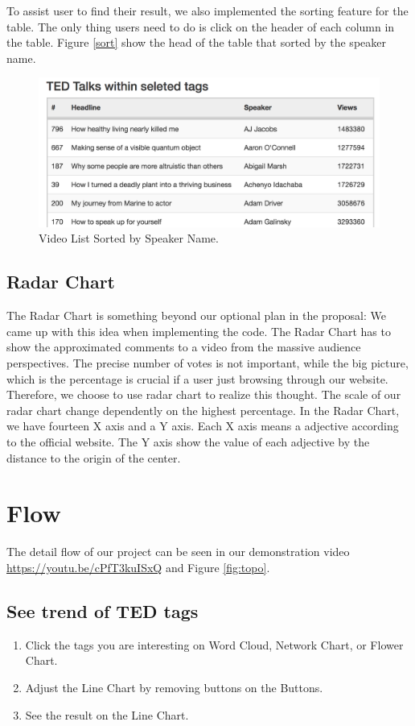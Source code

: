 \documentclass{report}
\numberwithin{figure}{section}
\begin{document}
To assist user to find their result, we also implemented the sorting feature for the table. The only thing users need to do is click on the header of each column in the table. Figure \ref{sort} show the head of the table that sorted by the speaker name.

\begin{figure}
\begin{center}
\includegraphics[scale=0.6]{sort}
\caption{Video List Sorted by Speaker Name.}
\label{fig:sort}
\end{center}
\end{figure}

\subsection{Radar Chart}
\quad The Radar Chart is something beyond our optional plan in the proposal: We came up with this idea when implementing the code. The Radar Chart has to show the approximated comments to a video from the massive audience perspectives. The precise number of votes is not important, while the big picture, which is the percentage is crucial if a user just browsing through our website. Therefore, we choose to use radar chart to realize this thought. The scale of our radar chart change dependently on the highest percentage.
 In the Radar Chart, we have fourteen X axis and a Y axis. Each X axis means a adjective according to the official website. The Y axis show the value of each adjective by the distance to the origin of the center.

\section{Flow}

\quad The detail flow of our project can be seen in our demonstration video \url{https://youtu.be/cPfT3kuISxQ} and Figure \ref{fig:topo}.

\subsection{See trend of TED tags}
\begin{enumerate}
\item Click the tags you are interesting on Word Cloud, Network Chart, or Flower Chart.
\item Adjust the Line Chart by removing buttons on the Buttons.
\item See the result on the Line Chart.
\end{enumerate}
\end{document}
